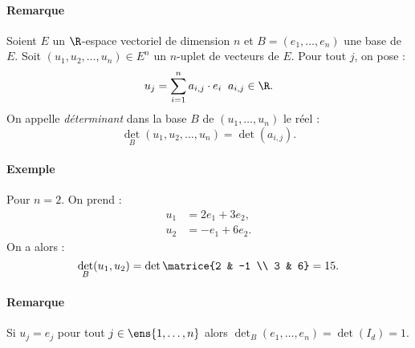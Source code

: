 \documentclass{mybourbaki}
\begin{document}
\paragraph{Remarque}Soient $E$ un $\R$-espace vectoriel de dimension $n$ et $B = (e_1,\ldots,e_n)$  une base de $E$. Soit $(u_1,u_2,\ldots,u_n) \in E^{n}$ un $n$-uplet  de vecteurs de $E$. Pour tout $j$, on pose : \[ u_j = \sum_{i=1}^{n}a_{i,j}\cdot e_{i}  \; \; a_{i,j}\in \R.\]On appelle \textit{déterminant} dans la base $B$ de $(u_1,\ldots,u_n)$ le réel : \[ \det_B(u_1,u_2,\ldots,u_n) = \det(a_{i,j}).\]

\paragraph{Exemple}Pour $n=2$. On prend :
\begin{align*}
u_1 &= 2e_1 + 3e_2, \\
u_2 &= -e_1 + 6e_2.
\end{align*}
On a alors : \[ \det_B(u_1,u_2) = \det \matrice{2 & -1 \\ 3 & 6} = 15.\]

\paragraph{Remarque}Si $u_j = e_j$ pour tout $j \in \ens{1,\ldots,n}$ alors $\det_B(e_1,\ldots,e_n) = \det(I_d) = 1$. 
\end{document}
